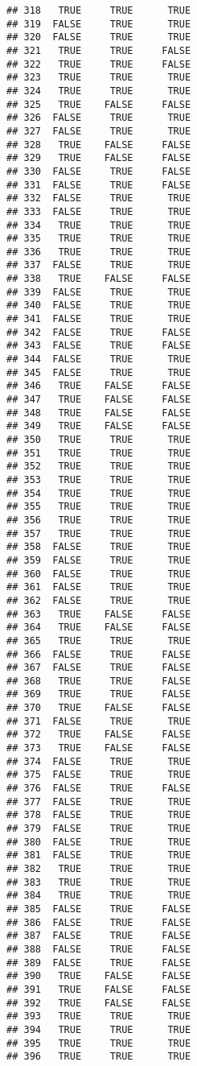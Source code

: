 \documentclass[
]{article}
\begin{document}
\begin{verbatim}
## 318   TRUE     TRUE      TRUE
## 319  FALSE     TRUE      TRUE
## 320  FALSE     TRUE      TRUE
## 321   TRUE     TRUE     FALSE
## 322   TRUE     TRUE     FALSE
## 323   TRUE     TRUE      TRUE
## 324   TRUE     TRUE      TRUE
## 325   TRUE    FALSE     FALSE
## 326  FALSE     TRUE      TRUE
## 327  FALSE     TRUE      TRUE
## 328   TRUE    FALSE     FALSE
## 329   TRUE    FALSE     FALSE
## 330  FALSE     TRUE     FALSE
## 331  FALSE     TRUE     FALSE
## 332  FALSE     TRUE      TRUE
## 333  FALSE     TRUE      TRUE
## 334   TRUE     TRUE      TRUE
## 335   TRUE     TRUE      TRUE
## 336   TRUE     TRUE      TRUE
## 337  FALSE     TRUE      TRUE
## 338   TRUE    FALSE     FALSE
## 339  FALSE     TRUE      TRUE
## 340  FALSE     TRUE      TRUE
## 341  FALSE     TRUE      TRUE
## 342  FALSE     TRUE     FALSE
## 343  FALSE     TRUE     FALSE
## 344  FALSE     TRUE      TRUE
## 345  FALSE     TRUE      TRUE
## 346   TRUE    FALSE     FALSE
## 347   TRUE    FALSE     FALSE
## 348   TRUE    FALSE     FALSE
## 349   TRUE    FALSE     FALSE
## 350   TRUE     TRUE      TRUE
## 351   TRUE     TRUE      TRUE
## 352   TRUE     TRUE      TRUE
## 353   TRUE     TRUE      TRUE
## 354   TRUE     TRUE      TRUE
## 355   TRUE     TRUE      TRUE
## 356   TRUE     TRUE      TRUE
## 357   TRUE     TRUE      TRUE
## 358  FALSE     TRUE      TRUE
## 359  FALSE     TRUE      TRUE
## 360  FALSE     TRUE      TRUE
## 361  FALSE     TRUE      TRUE
## 362  FALSE     TRUE      TRUE
## 363   TRUE    FALSE     FALSE
## 364   TRUE    FALSE     FALSE
## 365   TRUE     TRUE      TRUE
## 366  FALSE     TRUE     FALSE
## 367  FALSE     TRUE     FALSE
## 368   TRUE     TRUE     FALSE
## 369   TRUE     TRUE     FALSE
## 370   TRUE    FALSE     FALSE
## 371  FALSE     TRUE      TRUE
## 372   TRUE    FALSE     FALSE
## 373   TRUE    FALSE     FALSE
## 374  FALSE     TRUE      TRUE
## 375  FALSE     TRUE      TRUE
## 376  FALSE     TRUE     FALSE
## 377  FALSE     TRUE      TRUE
## 378  FALSE     TRUE      TRUE
## 379  FALSE     TRUE      TRUE
## 380  FALSE     TRUE      TRUE
## 381  FALSE     TRUE      TRUE
## 382   TRUE     TRUE      TRUE
## 383   TRUE     TRUE      TRUE
## 384   TRUE     TRUE      TRUE
## 385  FALSE     TRUE     FALSE
## 386  FALSE     TRUE     FALSE
## 387  FALSE     TRUE     FALSE
## 388  FALSE     TRUE     FALSE
## 389  FALSE     TRUE     FALSE
## 390   TRUE    FALSE     FALSE
## 391   TRUE    FALSE     FALSE
## 392   TRUE    FALSE     FALSE
## 393   TRUE     TRUE      TRUE
## 394   TRUE     TRUE      TRUE
## 395   TRUE     TRUE      TRUE
## 396   TRUE     TRUE      TRUE

\end{verbatim}
\end{document}
